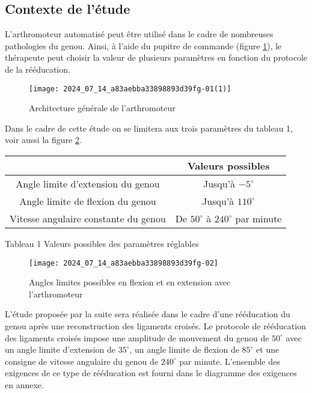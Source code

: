 \subsection{Contexte de l'étude}
L'arthromoteur automatisé peut être utilisé dans le cadre de nombreuses pathologies du genou. Ainsi, à l'aide du pupitre de commande (figure \ref{fig:ccs_mp_2024:fig:02}), le thérapeute peut choisir la valeur de plusieurs paramètres en fonction du protocole de la rééducation.

\begin{figure}[!h]
\centering
\texttt{[image: 2024\_07\_14\_a83aebba33898893d39fg-01(1)]}
\caption{\label{fig:ccs_mp_2024:fig:02}Architecture générale de l'arthromoteur}
\end{figure}
Dans le cadre de cette étude on se limitera aux trois paramètres du tableau 1, voir aussi la figure \ref{fig:ccs_mp_2024:fig:03}.

\begin{center}
\begin{tabular}{|c|c|}
\hline
 & Valeurs possibles \\
\hline
Angle limite d'extension du genou & Jusqu'à $-5^{\circ}$ \\
\hline
Angle limite de flexion du genou & Jusqu'à $110^{\circ}$ \\
\hline
Vitesse angulaire constante du genou & De $50^{\circ}$ à $240^{\circ}$ par minute \\
\hline
\end{tabular}
\end{center}

Tableau 1 Valeurs possibles des paramètres réglables

\begin{figure}[!h]
\centering
\texttt{[image: 2024\_07\_14\_a83aebba33898893d39fg-02]}
\caption{\label{fig:ccs_mp_2024:fig:03}Angles limites possibles en flexion et en extension avec l'arthromoteur}
\end{figure}

L'étude proposée par la suite sera réalisée dans le cadre d'une rééducation du genou après une reconstruction des ligaments croisés. Le protocole de rééducation des ligaments croisés impose une amplitude de mouvement du genou de $50^{\circ}$ avec un angle limite d'extension de $35^{\circ}$, un angle limite de flexion de $85^{\circ}$ et une consigne de vitesse angulaire du genou de $240^{\circ}$ par minute. L'ensemble des exigences de ce type de rééducation est fourni dans le diagramme des exigences en annexe.

